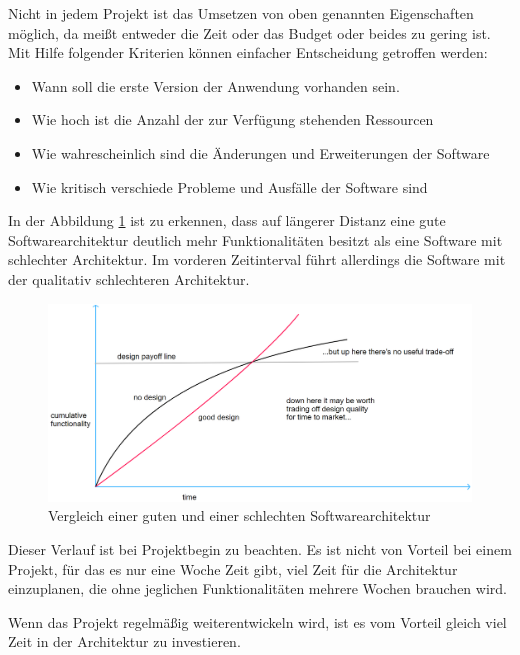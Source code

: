     Nicht in jedem Projekt ist das Umsetzen von oben genannten Eigenschaften möglich, 
    da meißt entweder die Zeit oder das Budget oder beides zu gering ist.
    Mit Hilfe folgender Kriterien können einfacher Entscheidung getroffen werden:
    \begin{itemize}
        \item Wann soll die erste Version der Anwendung vorhanden sein.
        \item Wie hoch ist die Anzahl der zur Verfügung stehenden Ressourcen
        \item Wie wahrescheinlich sind die Änderungen und Erweiterungen der Software
        \item Wie kritisch verschiede Probleme und Ausfälle der Software sind 
    \end{itemize}

    In der Abbildung \ref{fig:softQuality} ist zu erkennen, dass auf längerer Distanz eine gute Softwarearchitektur deutlich mehr Funktionalitäten 
    besitzt als eine Software mit schlechter Architektur. Im vorderen Zeitinterval führt allerdings die Software mit der qualitativ schlechteren Architektur.
    \begin{figure}[H]
        \centering
        \includegraphics[width=1\textwidth]{./images/QASoftwareCompare.png}
        \caption[Vergleich einer guten und einer schlechten Softwarearchitektur]{Vergleich einer guten und einer schlechten Softwarearchitektur \footnotemark}
        \label{fig:softQuality}
    \end{figure}
    Dieser Verlauf ist bei Projektbegin zu beachten. Es ist nicht von Vorteil bei einem Projekt, 
    für das es nur eine Woche Zeit gibt, viel Zeit für die Architektur einzuplanen, die ohne jeglichen Funktionalitäten mehrere Wochen brauchen wird.

    Wenn das Projekt regelmäßig weiterentwickeln wird, ist es vom Vorteil gleich viel Zeit in der Architektur zu investieren.
